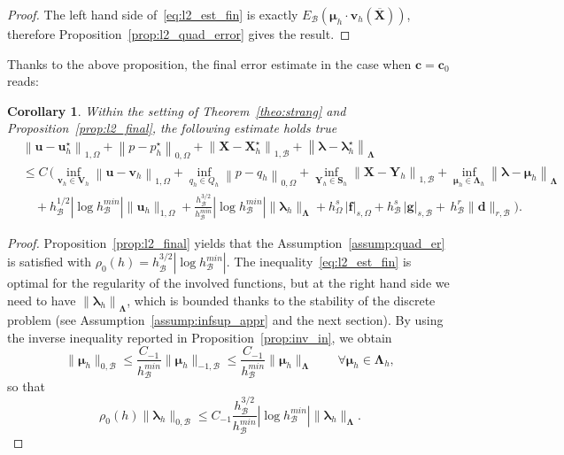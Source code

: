 \documentclass[oneside]{amsart} %
\newcommand{\norm}[1]{\left\lVert#1\right\rVert}
\newtheorem{corollary}{Corollary}
\newcommand\B{\mathcal B} %
\renewcommand\u{\mathbf{u}} %
\renewcommand\v{\mathbf{v}} %
\renewcommand\d{\mathbf{d}} %
\renewcommand\c{\mathbf{c}} %
\newcommand\f{\mathbf{f}} %
\newcommand\g{\mathbf{g}} %
\renewcommand\S{\mathbf{S}} %
\newcommand\X{\mathbf{X}} %
\newcommand\Xbar{\overline{\X}} %
\newcommand\Y{\mathbf{Y}} %
\newcommand\LL{{\boldsymbol{\Lambda}}} %
\newcommand\Vline{\mathbf{V}} %
\newcommand\Sline{\S} %
\newcommand\llambda{\boldsymbol\lambda} %
\newcommand\mmu{{\boldsymbol\mu}} %
\begin{document}
	\begin{proof}
		The left hand side of~\eqref{eq:l2_est_fin} is exactly $E_\B(\mmu_h\cdot\v_h(\Xbar))$, therefore Proposition~\ref{prop:l2_quad_error} gives the result.
	\end{proof}
	Thanks to the above proposition, the final error estimate in the case
	when $\c=\c_0$ reads: 
	\begin{corollary}
		Within the setting of Theorem~\ref{theo:strang} and Proposition~\ref{prop:l2_final}, the following estimate holds true
		\begin{equation*}
			\begin{aligned}
				&\norm{\u-\u_h^\star}_{1,\Omega} + \norm{p-p_h^\star}_{0,\Omega} + \norm{\X-\X_h^\star}_{1,\B} + \norm{\llambda-\llambda_h^\star}_{\LL} \\
				&\le C\,\bigg(\inf_{\v_h\in\Vline_h}\norm{\u-\v_h}_{1,\Omega} + \inf_{q_h\in Q_h}\norm{p-q_h}_{0,\Omega} + \inf_{\Y_h\in\Sline_h}\norm{\X-\Y_h}_{1,\B} + \inf_{\mmu_h\in\LL_h}\norm{\llambda-\mmu_h}_{\LL} \\
				&\quad+h_\B^{1/2}|\log h_\B^{min}|\|\u_h\|_{1,\Omega}+\frac{ h_\B^{3/2}}{h_\B^{min}}|\log h_\B^{min}|\|\llambda_h\|_{\LL} + h_\Omega^s\,|\f|_{s,\Omega} + h_\B^s\,|\g|_{s,\B} +\, h_\B^{r}\|\d\|_{r,\B}\bigg).
			\end{aligned}
		\end{equation*}
		\label{co:L2}
	\end{corollary}
	\begin{proof}
		Proposition~\ref{prop:l2_final} yields that the Assumption~\ref{assump:quad_er} is satisfied with ${\rho_0(h)=h_\B^{3/2}|\log h_\B^{min}|}$. The inequality~\eqref{eq:l2_est_fin} is optimal for the regularity of the involved functions, but at the right hand side we need to have $\norm{\llambda_h}_{\LL}$, which is bounded thanks to the stability of the discrete problem (see Assumption~\ref{assump:infsup_appr} and the next section). By using the inverse inequality reported in Proposition~\ref{prop:inv_in}, we obtain
		\begin{equation}\label{eq:inv_in}
			\| \mmu_h \|_{0,\B}  \le  \frac{C_{-1}}{h_\B^{min}} \|\mmu_h\|_{-1,\B} \le  \frac{C_{-1}}{h_\B^{min}} \|\mmu_h\|_{\LL}\qquad\forall\mmu_h\in\LL_h,
		\end{equation}
		so that
		$$
		\rho_0(h)\|\llambda_h\|_{0,\B} \le C_{-1} \frac{ h_\B^{3/2}}{h_\B^{min}}|\log h_\B^{min}|\|\llambda_h\|_{\LL}.
		$$
	\end{proof}
	
\end{document}
